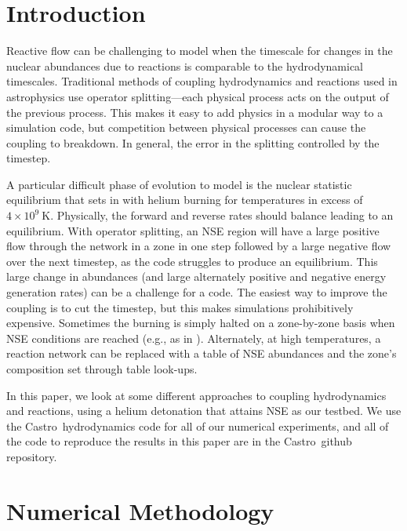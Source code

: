\documentclass[times,modern]{aastex62}
\newcommand{\castro}{{\sf Castro}}
\newcommand{\MarginPar}[1]{\marginpar{\vskip-\baselineskip\raggedright\tiny\sffamily\hrule\smallskip{\color{red}#1}\par\smallskip\hrule}}
\begin{document}
\section{Introduction}\label{Sec:Introduction}

Reactive flow can be challenging to model when the timescale for
changes in the nuclear abundances due to reactions is comparable to
the hydrodynamical timescales.  Traditional methods of coupling
hydrodynamics and reactions used in astrophysics use operator
splitting---each physical process acts on the output of the previous
process.  This makes it easy to add physics in a modular way to a
simulation code, but competition between physical processes can cause
the coupling to breakdown.  In general, the error in the splitting
controlled by the timestep.

A particular difficult phase of evolution to model is the nuclear
statistic equilibrium that sets in with helium burning for
temperatures in excess of $4\times 10^9~\mathrm{K}$.  Physically, the
forward and reverse rates should balance leading to an equilibrium.
With operator splitting, an NSE region will have a large positive flow
through the network in a zone in one step followed by a large negative
flow over the next timestep, as the code struggles to produce an
equilibrium.  This large change in abundances (and large alternately
positive and negative energy generation rates) can be a challenge for
a code.  The easiest way to improve the coupling is to cut the
timestep, but this makes simulations prohibitively expensive.
Sometimes the burning is simply halted on a zone-by-zone basis when
NSE conditions are reached (e.g., as in \citealt{hedet}).
Alternately, at high temperatures, a reaction network can be replaced
with a table of NSE abundances and the zone's composition set through
table look-ups\MarginPar{example? GCD?}.

In this paper, we look at some different approaches to coupling
hydrodynamics and reactions, using a helium detonation that attains
NSE as our testbed.  We use the \castro\ hydrodynamics code for all of
our numerical experiments, and all of the code to reproduce the results
in this paper are in the \castro\ github repository.

\section{Numerical Methodology}
\end{document}
